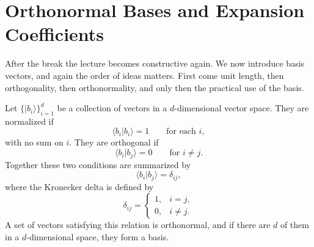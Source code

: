 \section{Orthonormal Bases and Expansion Coefficients}

After the break the lecture becomes constructive again. We now introduce basis vectors, and again the order of ideas matters. First come unit length, then orthogonality, then orthonormality, and only then the practical use of the basis.

Let \(\{|b_i\rangle\}_{i=1}^d\) be a collection of vectors in a \(d\)-dimensional vector space. They are normalized if
\begin{equation}
\langle b_i|b_i\rangle = 1
\qquad
\text{for each } i,
\end{equation}
with no sum on \(i\). They are orthogonal if
\begin{equation}
\langle b_i|b_j\rangle = 0
\qquad
\text{for } i \neq j.
\end{equation}
Together these two conditions are summarized by
\begin{equation}
\langle b_i|b_j\rangle = \delta_{ij},
\end{equation}
where the Kronecker delta is defined by
\begin{equation}
\delta_{ij}
=
\left\{
\begin{array}{ll}
1, & i=j,\\
0, & i\neq j.
\end{array}
\right.
\end{equation}
A set of vectors satisfying this relation is orthonormal, and if there are \(d\) of them in a \(d\)-dimensional space, they form a basis.

